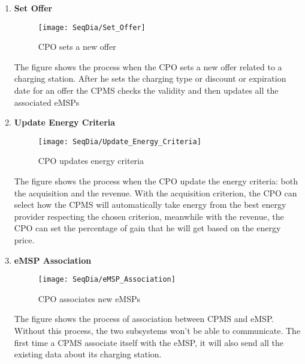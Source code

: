 \begin{enumerate}
        \newpage
        \item \textbf{Set Offer}
        \begin{figure}[H]
            \begin{center}
            \texttt{[image: SeqDia/Set\_Offer]}
            \caption{CPO sets a new offer}
            \label{fig:SetOffer}
            \end{center}
        \end{figure}
        The figure shows the process when the CPO sets a new offer related to a charging station. After he sets the charging type or discount or expiration date for an offer the CPMS checks the validity and then updates all the associated eMSPs
        \newpage
        \item \textbf{Update Energy Criteria}
        \begin{figure}[H]
            \begin{center}
            \texttt{[image: SeqDia/Update\_Energy\_Criteria]}
            \caption{CPO updates energy criteria}
            \label{fig:UpdateCriteria}
            \end{center}
        \end{figure}
        The figure shows the process when the CPO update the energy criteria: both the acquisition and the revenue. With the acquisition criterion, the CPO can select how the CPMS will automatically take energy from the best energy provider respecting the chosen criterion, meanwhile with the revenue, the CPO can set the percentage of gain that he will get based on the energy price.
        \newpage
        \item \textbf{eMSP Association}
        \begin{figure}[H]
            \begin{center}
            \texttt{[image: SeqDia/eMSP\_Association]}
            \caption{CPO associates new eMSPs}
            \label{fig:eMSPAssociation}
            \end{center}
        \end{figure}
        The figure shows the process of association between CPMS and eMSP. Without this process, the two subsystems won't be able to communicate. The first time a CPMS associate itself with the eMSP, it will also send all the existing data about its charging station.
\end{enumerate}

